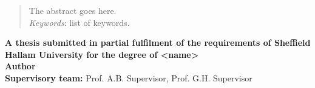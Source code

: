 
\begin{abstract}
The abstract goes here.\\

    \noindent
    \textit{Keywords}: list of keywords.
\end{abstract}

\vspace{3cm}
\begin{center}
\textbf{A thesis submitted in partial fulfilment of the requirements of Sheffield Hallam University for the degree of <name>}\\
\vspace{2cm}
\textbf {Author}\\
\vspace{2cm}
{\textbf {Supervisory team:} Prof. A.B. Supervisor, Prof. G.H. Supervisor}    
\end{center}
